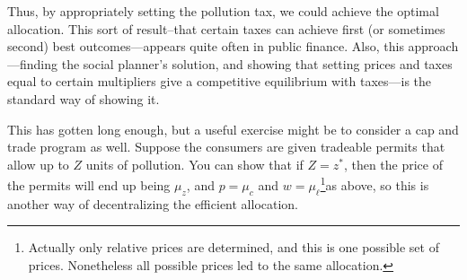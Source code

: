 \documentclass[12pt,reqno]{amsart}
\theoremstyle{definition}
\begin{document}
Thus, by appropriately setting the pollution tax, we could achieve the
optimal allocation. This sort of result--that certain taxes can
achieve first (or sometimes second) best outcomes---appears quite
often in public finance. Also, this approach---finding the social
planner's solution, and showing that setting prices and taxes equal to
certain multipliers give a competitive equilibrium with taxes---is the
standard way of showing it.

This has gotten long enough, but a useful exercise might be to
consider a cap and trade program as well. Suppose the consumers are
given tradeable permits that allow up to $Z$ units of pollution. You
can show that if $Z = z^*$, then the price of the permits will end up
being $\mu_z$, and $p=\mu_c$ and $w=\mu_\ell$\footnote{Actually only
  relative prices are determined, and this is one possible set of
  prices. Nonetheless all possible prices led to the same
  allocation.}as above, so this is another way of decentralizing the
efficient allocation.  
\end{document}

